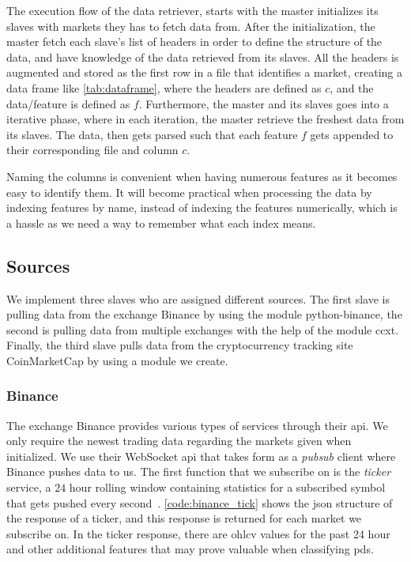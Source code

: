 The execution flow of the data retriever, starts with the master initializes its slaves with markets they has to fetch data from. After the initialization, the master fetch each slave's list of headers in order to define the structure of the data, and have knowledge of the data retrieved from its slaves. All the headers is augmented and stored as the first row in a file that identifies a market, creating a data frame like \autoref{tab:dataframe}, where the headers are defined as $c$, and the data/feature is defined as $f$. Furthermore, the master and its slaves goes into a iterative phase, where in each iteration, the master retrieve the freshest data from its slaves. The data, then gets parsed such that each feature $f$ gets appended to their corresponding file and column $c$.
 
Naming the columns is convenient when having numerous features as it becomes easy to identify them. It will become practical when processing the data by indexing features by name, instead of indexing the features numerically, which is a hassle as we need a way to remember what each index means.



\subsection{Sources}
We implement three slaves who are assigned different sources. The first slave is pulling data from the exchange Binance by using the module python-binance, the second is pulling data from multiple exchanges with the help of the module ccxt. Finally, the third slave pulls data from the cryptocurrency tracking site CoinMarketCap by using a module we create.

\subsubsection{Binance}
The exchange Binance provides various types of services through their \ac{api}. We only require the newest trading data regarding the markets given when initialized. We use their WebSocket \ac{api} that takes form as a \emph{pubsub} client where Binance pushes data to us. The first function that we subscribe on is the \emph{ticker} service, a $24$ hour rolling window containing statistics for a subscribed symbol that gets pushed every second~\cite{binance_git}. \autoref{code:binance_tick} shows the \ac{json} structure of the response of a ticker, and this response is returned for each market we subscribe on. In the ticker response, there are \ac{ohlcv} values for the past 24 hour and other additional features that may prove valuable when classifying \acp{pd}.

